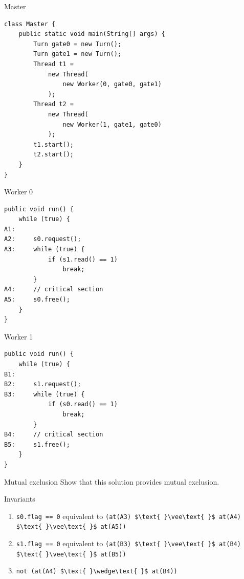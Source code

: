 \begin{frame}[fragile]{Master}
\begin{lstlisting}
class Master {
    public static void main(String[] args) {
        Turn gate0 = new Turn();
        Turn gate1 = new Turn();
        Thread t1 = 
            new Thread(
                new Worker(0, gate0, gate1)
            );
        Thread t2 = 
            new Thread(
                new Worker(1, gate1, gate0)
            );
        t1.start();
        t2.start();
    }
}
\end{lstlisting}
\end{frame}

\begin{frame}[fragile]{Worker 0}
\begin{lstlisting}
public void run() {
    while (true) {
A1:
A2:     s0.request();
A3:     while (true) {
            if (s1.read() == 1) 
                break;
        }
A4:     // critical section
A5:     s0.free();
    }
}
\end{lstlisting}
\end{frame}

\begin{frame}[fragile]{Worker 1}
\begin{lstlisting}
public void run() {
    while (true) {
B1:
B2:     s1.request();
B3:     while (true) {
            if (s0.read() == 1) 
                break;
        }
B4:     // critical section
B5:     s1.free();
    }
}
\end{lstlisting}
\end{frame}

\begin{frame}[fragile]{Mutual exclusion}
  Show that this solution provides mutual exclusion.
\end{frame}

\begin{frame}{Invariants}
  \begin{enumerate}
  \item \lstinline!s0.flag == 0! equivalent to
    \lstinline!(at(A3) $\text{ }\vee\text{ }$ at(A4) $\text{ }\vee\text{ }$ at(A5))!
  \item \lstinline!s1.flag == 0! equivalent to
    \lstinline!(at(B3) $\text{ }\vee\text{ }$ at(B4) $\text{ }\vee\text{ }$ at(B5))!
  \item \lstinline!not (at(A4) $\text{ }\wedge\text{ }$ at(B4))!
  \end{enumerate}
\end{frame}

